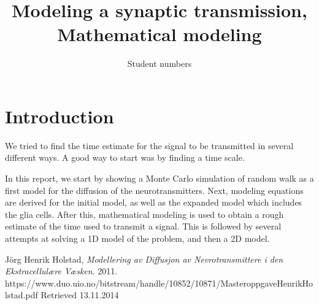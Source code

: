 \documentclass{article}
\title{Modeling a synaptic transmission, \\
Mathematical modeling}
\author{Student numbers }
\begin{document}
\maketitle


\section{Introduction}
We tried to find the time estimate for the signal to be transmitted in several different ways. 
A good way to start was by finding a time 	scale. 


In this report, we start by showing a Monte Carlo simulation of random walk as a first model for the diffusion of the neurotransmitters.  Next, modeling equations are derived for the initial model, as well as the expanded model which includes the glia cells.  After this, mathematical modeling is used to obtain a rough estimate of the time used to transmit a signal. This is followed by several attempts at solving a 1D model of the problem, and then a 2D model.



\begin{thebibliography}{9}
  Jörg Henrik Holstad,
  \emph{Modellering av Diffusjon av Nevrotransmittere
i den Ekstracellulære Væsken}.
  2011.\\
https://www.duo.uio.no/bitstream/handle/10852/10871/MasteroppgaveHenrikHolstad.pdf
Retrieved 13.11.2014
\end{thebibliography}
\end{document}
